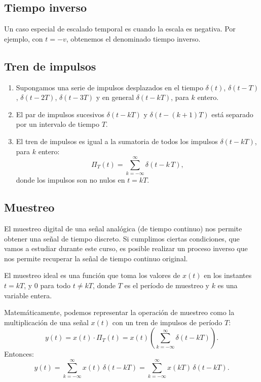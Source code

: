 \documentclass[11pt,a4paper,openany]{book}
\begin{document}
\subsection{Tiempo inverso}

Un caso especial de escalado temporal es cuando la escala es
negativa. Por ejemplo, con $t = -v$, obtenemos el denominado tiempo inverso.

\subsection{Tren de impulsos}

\begin{enumerate}
	\item Supongamos una serie de impulsos desplazados en el tiempo $\delta(t)$,
	$\delta(t - T)$, $\delta(t - 2T)$, $\delta(t - 3T)$ y en
	general $\delta(t - kT)$, para $k$ entero.
	
	\item El par de impulsos sucesivos $\delta(t - kT)$ y $\delta(t - (k+1)T)$ está separado por un intervalo de tiempo $T$.
	
	\item El tren de impulsos es igual a la sumatoria de todos los
	impulsos $\delta(t - kT)$, para $k$ entero:
	\begin{equation}
		\Pi_{T}(t) = \sum_{k=-\infty}^{\infty} \delta(t - k \, T),
	\end{equation}
	donde los impulsos son no nulos en $t = kT$.
\end{enumerate}

\subsection{Muestreo}

El muestreo digital de una señal analógica (de tiempo continuo) nos permite obtener una señal de tiempo discreto. Si cumplimos ciertas condiciones, que vamos a estudiar durante este curso, 
es posible realizar un proceso inverso que nos permite recuperar la señal de tiempo continuo original.

El muestreo ideal es una función que toma los valores de $x(t)$ en los instantes $t = kT$, y $0$ para todo $t \neq kT$, 
donde $T$ es el período de muestreo y $k$ es una variable entera.

Matemáticamente, podemos representar la operación de muestreo como 
la multiplicación de una señal $x(t)$ con un tren de impulsos de período $T$:
\begin{equation}
	y(t) = x(t) \cdot \Pi_{T}(t) = x(t) \left( \sum_{k=-\infty}^{\infty} \delta(t - kT) \right).
\end{equation}
Entonces:
\begin{equation}
	y(t) = \sum_{k=-\infty}^{\infty} x(t) \, \delta(t - kT) = \sum_{k=-\infty}^{\infty} x(kT) \, \delta(t - kT).
\end{equation}
\end{document}
